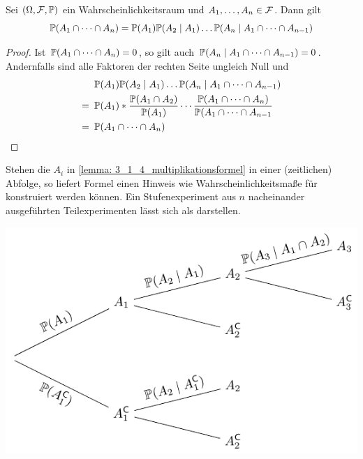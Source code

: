 \begin{lemma}[Multiplikationsformel] \label{lemma: 3_1_4_multiplikationsformel}
	Sei $(\Omega, \F, \P)$ ein Wahrscheinlichkeitsraum und $A_1, \dots, A_n \in \F$. Dann gilt
	\begin{equation*}
	\P(A_1 \cap \dots \cap A_n) = \P(A_1) \P(A_2 \mid A_1) \dots \P(A_n \mid A_1 \cap \dots \cap A_{n-1})
	\end{equation*}
\end{lemma}
\begin{proof}
	Ist $\P(A_1 \cap \dots \cap A_n) = 0$, so gilt auch $\P(A_n \mid A_1 \cap \dots \cap A_{n-1}) = 0$. Andernfalls sind alle Faktoren der rechten Seite ungleich Null und
	\begin{equation*}
	\begin{aligned}
		&\P(A_1) \P(A_2 \mid A_1) \dots \P(A_n \mid A_1 \cap \dots \cap A_{n-1}) \\
		= \enskip &\P(A_1) * \frac{\P(A_1 \cap A_2)}{\P(A_1)} \cdots \frac{\P(A_1 \cap \dots \cap A_n)}{\P(A_1 \cap \dots \cap A_{n-1}} \\
		= \enskip &\P(A_1 \cap \dots \cap A_n)
	\end{aligned}	
	\end{equation*}
\end{proof}

Stehen die $A_i$ in \cref{lemma: 3_1_4_multiplikationsformel} in einer (zeitlichen) Abfolge, so liefert Formel einen Hinweis wie Wahrscheinlichkeitsmaße für  konstruiert werden können. Ein Stufenexperiment aus $n$ nacheinander ausgeführten Teilexperimenten lässt sich als  darstellen.

\begin{center}
	\includegraphics{./stoch_abbildungen/baum_1.pdf}
\end{center}

